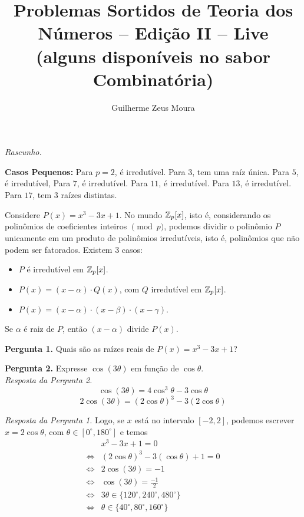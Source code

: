 \documentclass[10pt, a4paper]{article}
\title{Problemas Sortidos de Teoria dos Números -- Edição II -- Live \\\vspace{.25ex}(alguns disponíveis no sabor Combinatória)}
\author{Guilherme Zeus Moura}
\begin{document}
	
	\zeustitle	


		\noindent \textit{Rascunho.}

		\noindent \textbf{Casos Pequenos: } Para $p = 2$, é irredutível. Para $3$, tem uma raíz única. Para $5$, é irredutível, Para $7$, é irredutível. Para $11$, é irredutível. Para $13$, é irredutível. Para $17$, tem $3$ raízes distintas.  

		Considere $P(x) = x^3 - 3x + 1$. No mundo $\mathbb{Z}_p[x]$, isto é, considerando os polinômios de coeficientes inteiros $\pmod{p}$, podemos dividir o polinômio $P$ unicamente em um produto de polinômios irredutíveis, isto é, polinômios que não podem ser fatorados. Existem 3 casos:

		\begin{itemize}
			\item $P$ é irredutível em $\mathbb{Z}_p[x]$.
			\item $P(x) = (x - \alpha) \cdot Q(x)$, com $Q$ irredutível em $\mathbb{Z}_p[x]$.
			\item $P(x) = (x - \alpha) \cdot (x - \beta) \cdot (x - \gamma)$.
		\end{itemize}

		\begin{thm}
			Se $\alpha$ é raiz de $P$, então $(x - \alpha)$ divide $P(x)$.
		\end{thm}

		\noindent \textbf{Pergunta 1.} Quais são as raízes reais de $P(x) = x^3 - 3x + 1$?

		\noindent \textbf{Pergunta 2.} Expresse $\cos(3\theta)$ em função de $\cos\theta$.
		\\ \textit{Resposta da Pergunta 2.} \[ \cos(3\theta) = 4\cos^3\theta - 3\cos\theta\]	
		\[ 2\cos(3\theta) = (2 \cos\theta)^3 - 3 (2\cos\theta)\]

		\noindent \textit{Resposta da Pergunta 1.}
		Logo, se $x$ está no intervalo $[-2, 2]$, podemos escrever $x = 2\cos\theta$, com $\theta \in [0^\circ, 180^\circ]$ e temos
		\begin{align*}
			     & x^3 - 3x + 1 = 0 \\
			\iff & (2 \cos \theta)^3 - 3(\cos \theta) + 1 = 0 \\
			\iff & 2\cos(3\theta) = -1 \\
			\iff & \cos(3\theta) = \frac{-1}{2} \\
		   	\iff & 3\theta \in \{ 120^\circ, 240^\circ, 480^\circ\} \\
			\iff & \theta \in \{40^\circ, 80^\circ, 160^\circ\}
		\end{align*}
\end{document}
